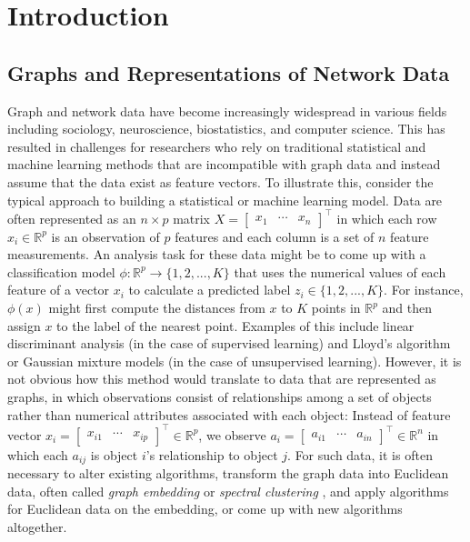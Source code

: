 \documentclass[
  11pt,
]{article}
\theoremstyle{definition}
\theoremstyle{definition}
\theoremstyle{definition}
\theoremstyle{definition}
\theoremstyle{remark}
\begin{document}
\hypertarget{introduction}{%
\section{Introduction}\label{introduction}}

\hypertarget{graphs-and-representations-of-network-data}{%
\subsection{Graphs and Representations of Network Data}\label{graphs-and-representations-of-network-data}}

Graph and network data have become increasingly widespread in various fields including sociology, neuroscience, biostatistics, and computer science.
This has resulted in challenges for researchers who rely on traditional statistical and machine learning methods that are incompatible with graph data and instead assume that the data exist as feature vectors.
To illustrate this, consider the typical approach to building a statistical or machine learning model.
Data are often represented as an \(n \times p\) matrix \(X = \begin{bmatrix} x_1 & \cdots & x_n \end{bmatrix}^\top\) in which each row \(x_i \in \mathbb{R}^p\) is an observation of \(p\) features and each column is a set of \(n\) feature measurements.
An analysis task for these data might be to come up with a classification model \(\phi : \mathbb{R}^p \to \{1, 2, ..., K\}\) that uses the numerical values of each feature of a vector \(x_i\) to calculate a predicted label \(z_i \in \{1, 2, ..., K\}\).
For instance, \(\phi(x)\) might first compute the distances from \(x\) to \(K\) points in \(\mathbb{R}^p\) and then assign \(x\) to the label of the nearest point.
Examples of this include linear discriminant analysis (in the case of supervised learning) and Lloyd's algorithm \citep{1056489} or Gaussian mixture models \citep{doi:10.1198/016214502760047131} (in the case of unsupervised learning).
However, it is not obvious how this method would translate to data that are represented as graphs, in which observations consist of relationships among a set of objects rather than numerical attributes associated with each object:
Instead of feature vector \(x_i = \begin{bmatrix} x_{i1} & \cdots & x_{ip} \end{bmatrix}^\top \in \mathbb{R}^p\), we observe \(a_i = \begin{bmatrix} a_{i1} & \cdots & a_{in} \end{bmatrix}^\top \in \mathbb{R}^n\) in which each \(a_{ij}\) is object \(i\)'s relationship to object \(j\).
For such data, it is often necessary to alter existing algorithms, transform the graph data into Euclidean data, often called \emph{graph embedding} or \emph{spectral clustering} \citep{vonLuxburg2007}, and apply algorithms for Euclidean data on the embedding, or come up with new algorithms altogether.
\end{document}
